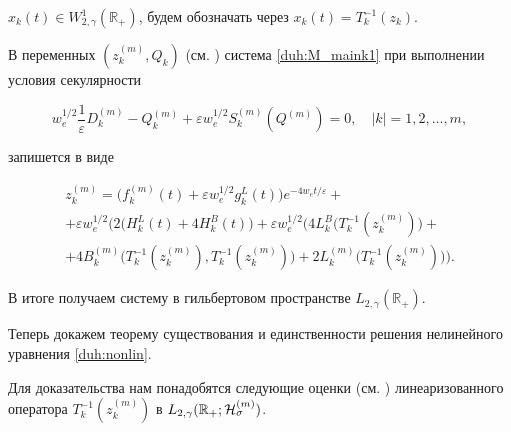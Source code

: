 $x_k(t)\in W^1_{2,\gamma}(\mathbb R_{+})$, будем обозначать через $x_k(t)=T^{-1}_k(z_k)$. 



В переменных  $(z^{(m)}_k, Q_k)$ (см. \cite{duh:RVD1}) система \eqref{duh:M_maink1} при выполнении условия секулярности 

\begin{equation}

w_e^{1/2}\frac1\varepsilon D^{(m)}_k-Q^{(m)}_k+\varepsilon w_e^{1/2}S^{(m)}_k(Q^{(m)})

=0,\quad |k|=1, 2, \dots,m, 


\end{equation}

запишется в виде 

\begin{multline}

z^{(m)}_k=

\bigl(f^{(m)}_k(t)+\varepsilon w_e^{1/2} g^L_k(t)\bigr)e^{-4w_e t/ \varepsilon } +

\\

+\varepsilon w_e^{1/2}

\bigl(2(H^L_k(t)+4H^B_k(t)\bigr) + 

\varepsilon w_e^{1/2}\bigl(4L^B_k \bigl(T_{k}^{-1}(z^{(m)}_{k})\bigr)+ 

\\ + 4B^{(m)}_k \bigl(T_{k}^{-1}(z^{(m)}_{k}),T_{k}^{-1}(z^{(m)}_{k})\bigr)+

2L^{(m)}_k\bigl(T_k^{-1}(z^{(m)}_k)\bigr)\bigr).

\label{duh:nonlin}

\end{multline}

В итоге получаем систему в гильбертовом пространстве $L_{2,\gamma}(\mathbb R_{+})$.




Теперь докажем теорему существования и единственности решения нелинейного уравнения \eqref{duh:nonlin}. 

Для доказательства нам понадобятся следующие оценки (см. \cite{duh:duxx2016}) линеаризованного оператора $T^{-1}_k(z^{(m)}_k)$ в $L_{2,\gamma}(\mathbb R_{+};{\cal H}^{(m)}_\sigma)$.



